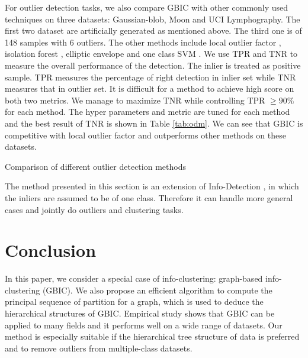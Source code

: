 For outlier detection tasks, we also compare GBIC with other commonly used techniques on three datasets: Gaussian-blob, Moon and UCI Lymphography. The first two dataset are artificially generated as mentioned above. The third one is of 148 samples with 6 outliers. The other methods include local outlier factor \citep{Breunig}, isolation forest \citep{if}, elliptic envelope \citep{rousseeuw1999fast} and one class SVM \citep{svm}. We use TPR and TNR to measure the overall performance of the detection. The inlier is treated as positive sample. TPR measures the percentage of right detection in inlier set while TNR measures that in outlier set. It is difficult for a method to achieve high score on both two metrics. We manage to maximize TNR while controlling TPR $\geq 90\%$ for each method. The hyper parameters and metric are tuned for each method and the best result of TNR is shown in Table \ref{tab:odm}. We can see that GBIC is competitive with local outlier factor and outperforms other methods on these datasets.

\begin{table}
\centering

\caption{Comparison of different outlier detection methods}\label{tab:odm}
\end{table}

The method presented in this section is an extension of Info-Detection \citep{zhao2019info}, in which the inliers are assumed to be of one class. Therefore it can handle more general cases and
jointly do outliers and clustering tasks.

\section{Conclusion}\label{sec:conc}
In this paper, we consider a special case of info-clustering: graph-based info-clustering (GBIC). We also propose an efficient algorithm to compute the principal sequence of partition for a graph, which is used to deduce the hierarchical structures of GBIC. Empirical study shows that GBIC can be applied to many fields and it performs well on a wide range of datasets. Our method is especially suitable if the hierarchical tree structure of data is preferred and to remove outliers from multiple-class datasets.


%
